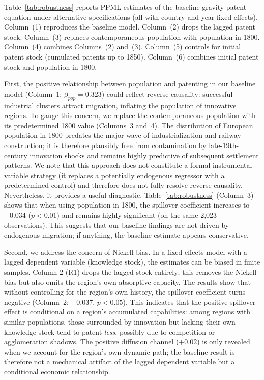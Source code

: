\documentclass[letterpaper,12pt,leqno]{article}
\begin{document}


Table~\ref{tab:robustness} reports PPML estimates of the baseline gravity patent equation under alternative specifications (all with country and year fixed effects). Column~(1) reproduces the baseline model. Column~(2) drops the lagged patent stock. Column~(3) replaces contemporaneous population with population in 1800. Column~(4) combines Columns~(2) and~(3). Column~(5) controls for initial patent stock (cumulated patents up to 1850). Column~(6) combines initial patent stock and population in 1800.

First, the positive relationship between population and patenting in our baseline model (Column~1: \(\beta_{pop} = 0.323\)) could reflect reverse causality: successful industrial clusters attract migration, inflating the population of innovative regions. To gauge this concern, we replace the contemporaneous population with its predetermined 1800 value (Columns~3 and~4). The distribution of European population in 1800 predates the major wave of industrialization and railway construction; it is therefore plausibly free from contamination by late-19th-century innovation shocks and remains highly predictive of subsequent settlement patterns. We note that this approach does not constitute a formal instrumental variable strategy (it replaces a potentially endogenous regressor with a predetermined control) and therefore does not fully resolve reverse causality. Nevertheless, it provides a useful diagnostic.
Table~\ref{tab:robustness} (Column~3) shows that when using population in 1800, the spillover coefficient increases to \(+0.034\) (\(p < 0.01\)) and remains highly significant (on the same 2,023 observations). This suggests that our baseline findings are not driven by endogenous migration; if anything, the baseline estimate appears conservative.

Second, we address the concern of Nickell bias. In a fixed-effects model with a lagged dependent variable (knowledge stock), the estimates can be biased in finite samples. Column 2 (R1) drops the lagged stock entirely; this removes the Nickell bias but also omits the region's own absorptive capacity.
The results show that without controlling for the region's own history, the spillover coefficient turns negative (Column~2: \(-0.037\), \(p < 0.05\)). This indicates that the positive spillover effect is conditional on a region's accumulated capabilities: among regions with similar populations, those surrounded by innovation but lacking their own knowledge stock tend to patent \textit{less}, possibly due to competition or agglomeration shadows. The positive diffusion channel (\(+0.02\)) is only revealed when we account for the region's own dynamic path; the baseline result is therefore not a mechanical artifact of the lagged dependent variable but a conditional economic relationship.
\end{document}
